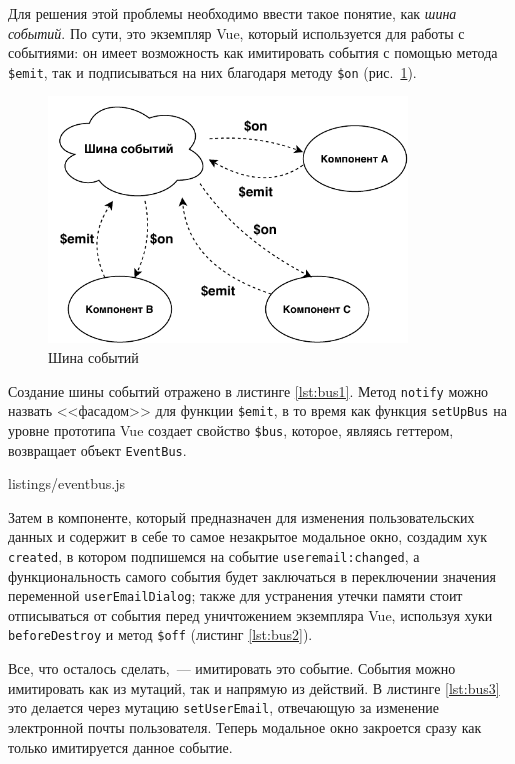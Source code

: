 Для решения этой проблемы необходимо ввести такое понятие, как \textit{шина событий}. По сути, это экземпляр Vue, который используется для работы с событиями: он имеет возможность как имитировать события с помощью метода \texttt{\$emit}, так и подписываться на них благодаря методу \texttt{\$on} (рис.~\ref{fig:bus}).

\begin{figure}[h]
	\centering
	\includegraphics[width=0.85\textwidth, keepaspectratio]{figures/eventbus}
	\caption{Шина событий}
	\label{fig:bus}
\end{figure}

Создание шины событий отражено в листинге \ref{lst:bus1}. Метод \texttt{notify} можно назвать <<фасадом>> для функции \texttt{\$emit}, в то время как функция \texttt{setUpBus} на уровне прототипа Vue создает свойство \texttt{\$bus}, которое, являясь геттером, возвращает объект \texttt{EventBus}.

\clearpage


{listings/eventbus.js}

Затем в компоненте, который предназначен для изменения пользовательских данных и содержит в себе то самое незакрытое модальное окно, создадим хук \texttt{created}, в котором подпишемся на событие \texttt{useremail:changed}, а функциональность самого события будет заключаться в переключении значения переменной \texttt{userEmailDialog}; также для устранения утечки памяти стоит отписываться от события перед уничтожением экземпляра Vue, используя хуки \texttt{beforeDestroy} и метод \texttt{\$off} (листинг \ref{lst:bus2}).

Все, что осталось сделать,~--- имитировать это событие. События можно имитировать как из мутаций, так и напрямую из действий. В листинге \ref{lst:bus3} это делается через мутацию \texttt{setUserEmail}, отвечающую за изменение электронной почты пользователя. Теперь модальное окно закроется сразу как только имитируется данное событие.

